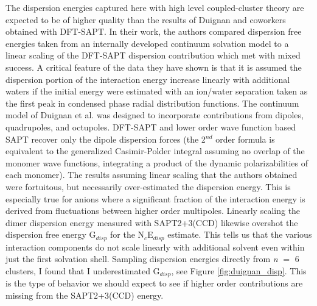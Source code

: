 \begin{sie}
  The dispersion energies captured here with high level coupled-cluster theory are expected to be of higher quality than the results of Duignan and 
  coworkers obtained with DFT-SAPT\cite{duignan2014collins}. In their work, the authors compared dispersion free energies taken from an internally 
  developed continuum solvation model to a linear scaling of the DFT-SAPT dispersion contribution which met with mixed success. A critical feature 
  of the data they have shown is that it is assumed the dispersion portion of the interaction energy increase linearly with additional waters if the
  initial energy were estimated with an ion/water separation taken as the first peak in condensed phase radial distribution functions. The 
  continuum model of Duignan et al. was designed to incorporate contributions from dipoles, quadrupoles, and octupoles\cite{duignan2014collins}. DFT-SAPT
  and lower order wave function based SAPT recover only the dipole dispersion forces (the 2$^{nd}$ order formula is equivalent to the generalized 
  Casimir-Polder integral assuming no overlap of the monomer wave functions, integrating a product of the dynamic polarizabilities of each 
  monomer\cite{tang_disp}). The results assuming linear scaling that the authors obtained were fortuitous, but necessarily over-estimated the dispersion
  energy. This is especially true for anions where a significant fraction of the interaction energy is derived from fluctuations between higher order
  multipoles. Linearly scaling the dimer dispersion energy measured with SAPT2+3(CCD) likewise overshot the dispersion free energy G$_{disp}$ for the
  N$_{c}$E$_{disp}$ estimate. This tells us that the various interaction components do not scale linearly with additional solvent even within just the 
  first solvation shell. Sampling dispersion energies directly from \emph{n} $=$ 6 clusters, I found that I underestimated G$_{disp}$, see Figure 
  \ref{fig:duignan_disp}. This is the type of behavior we should expect to see if higher order contributions are missing from the SAPT2+3(CCD) energy.
  

\end{sie}

